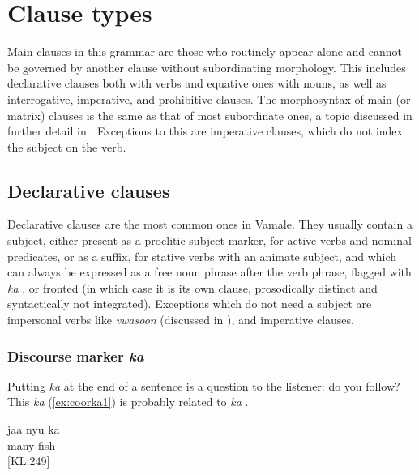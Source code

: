 

\section{Clause types}
\label{sec:clause_types}

Main clauses in this grammar are those who routinely appear alone and cannot be governed by another clause without subordinating morphology. This includes declarative clauses both with verbs and equative ones with nouns, as well as interrogative, imperative, and prohibitive clauses.
The morphosyntax of main (or matrix) clauses is the same as that of most subordinate ones, a topic discussed in further detail in . Exceptions to this are imperative clauses, which do not index the subject on the verb. 


\subsection{Declarative clauses}
\label{sec:decl_clauses}
Declarative clauses are the most common ones in Vamale. They usually contain a subject, either present as a proclitic subject marker, for active verbs and nominal predicates, or as a suffix, for stative verbs with an animate subject, and which can always be expressed as a free noun phrase after the verb phrase, flagged with \textit{ka} , or fronted (in which case it is its own clause, prosodically distinct and syntactically not integrated). Exceptions which do not need a subject are impersonal verbs like \textit{vwasoon}  (discussed in ), and imperative clauses.

\subsubsection{Discourse marker \textit{ka}}
\label{discourse ka}

Putting \textit{ka} at the end of a sentence is a question to the listener: do you follow? This \textit{ka} (\ref{ex:coorka1}) is probably related to \textit{ka} .

	\ea \label{ex:coorka1}
	\gll jaa nyu ka\\ 
	 many fish \\ 
	\glt {} {[KL:249]}
	\z 
	
